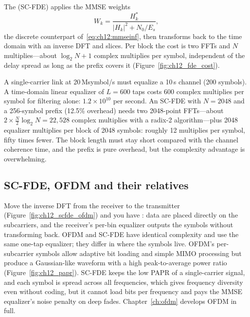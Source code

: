 The  (SC-FDE) applies the MMSE weights
\begin{equation}
W_k=\frac{H_k^*}{|H_k|^2+N_0/E_s},
\end{equation}
the discrete counterpart of~\eqref{eq:ch12:mmseinf}, then transforms back to the time domain with an
inverse DFT and slices. Per block the cost is two FFTs and $N$ multiplies---about
$\log_2N+1$ complex multiplies per symbol, independent of the delay spread as long as the prefix
covers it (Figure~\ref{fig:ch12_fde_cost}).

\begin{worked}
A single-carrier link at 20\,Msymbol/s must equalize a 10\,\textmu s channel (200 symbols). A
time-domain linear equalizer of $L=600$ taps costs 600 complex multiplies per symbol for filtering
alone: $1.2\times10^{10}$ per second. An SC-FDE with $N=2048$ and a 256-symbol prefix (12.5\%
overhead) needs two 2048-point FFTs---about $2\times\frac{N}{2}\log_2N=22{,}528$ complex multiplies with a radix-2
algorithm---plus 2048 equalizer multiplies per block of 2048 symbols: roughly 12 multiplies per
symbol, fifty times fewer. The block length must stay short compared with the channel coherence time,
and the prefix is pure overhead, but the complexity advantage is overwhelming.
\end{worked}

\subsection{SC-FDE, OFDM and their relatives}

Move the inverse DFT from the receiver to the transmitter (Figure~\ref{fig:ch12_scfde_ofdm}) and you have : data are placed
directly on the subcarriers, and the receiver's per-bin equalizer outputs the symbols without
transforming back. OFDM and SC-FDE have identical complexity and use the same one-tap equalizer; they
differ in where the symbols live. OFDM's per-subcarrier symbols allow adaptive bit loading and simple
MIMO processing but produce a Gaussian-like waveform with a high peak-to-average power ratio
(Figure~\ref{fig:ch12_papr}). SC-FDE
keeps the low PAPR of a single-carrier signal, and each symbol is spread across all frequencies, which
gives frequency diversity even without coding, but it cannot load bits per frequency and pays the
MMSE equalizer's noise penalty on deep fades. Chapter~\ref{ch:ofdm} develops OFDM in full.

